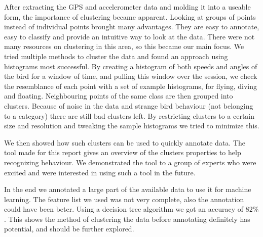 After extracting the GPS and accelerometer data and molding it into a useable form, the importance of clustering became apparent. Looking at groups of points instead of individual points brought many advantages. They are easy to annotate, easy to classify and provide an intuitive way to look at the data. There were not many resources on clustering in this area, so this became our main focus. We tried multiple methods to cluster the data and found an approach using histograms most successful. By creating a histogram of both speeds and angles of the bird for a window of time, and pulling this window over the session, we check the resemblance of each point with a set of example histograms, for flying, diving and floating. Neighbouring points of the same class are then grouped into clusters. Because of noise in the data and strange bird behaviour (not belonging to a category) there are still bad clusters left. By restricting clusters to a certain size and resolution and tweaking the sample histograms we tried to minimize this. 

We then showed how such clusters can be used to quickly annotate data. The tool made for this report gives an overview of the clusters properties to help recognizing behaviour. We demonstrated the tool to a group of experts who were excited and were interested in using such a tool in the future.

In the end we annotated a large part of the available data to use it for machine learning. The feature list we used was not very complete, also the annotation could have been beter. Using a decision tree algorithm we got an accuracy of $82\%$. This shows the method of clustering the data before annotating definitely has potential, and should be further explored.